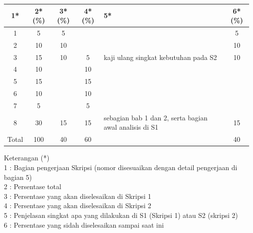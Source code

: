 \documentclass[a4paper,twoside]{article}
\begin{document}
\begin{center}
  \begin{tabular}{ | c | c | c | c | l | c |}
    \hline
    1*  & 2*(\%) & 3*(\%) & 4*(\%) &5* &6*(\%)\\ \hline \hline
    1   & 5  & 5  &  &  & 5 \\ \hline
    2   & 10 & 10  &   &  & 10 \\ \hline
    3   & 15  & 10  & 5 & {\footnotesize kaji ulang singkat kebutuhan pada S2}  & 10  \\ \hline
    4   & 10  &  & 10 &  & \\ \hline
    5   & 15  &   & 15 & & \\ \hline
    6   & 10 &   & 10  & & \\ \hline
    7   & 5 &   & 5  & & \\ \hline
    8   & 30  & 15  & 15 & {\footnotesize sebagian bab 1 dan 2, serta bagian awal analisis di S1} & 15 \\ \hline
    Total  & 100  & 40  & 60 &  & 40\\ \hline
                          \end{tabular}
\end{center}

Keterangan (*)\\
1 : Bagian pengerjaan Skripsi (nomor disesuaikan dengan detail pengerjaan di bagian 5)\\
2 : Persentase total \\
3 : Persentase yang akan diselesaikan di Skripsi 1 \\
4 : Persentase yang akan diselesaikan di Skripsi 2 \\
5 : Penjelasan singkat apa yang dilakukan di S1 (Skripsi 1) atau S2 (skripsi 2)\\
6 : Persentase yang sidah diselesaikan sampai saat ini

\end{document}
